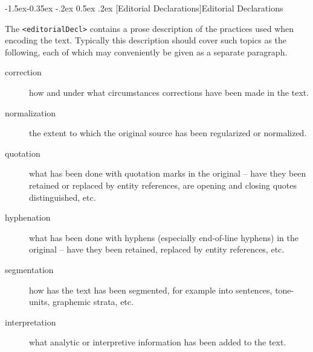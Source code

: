 \documentclass[11pt,twoside]{article}\makeatletter
\makeatletter
\renewcommand\subsubsection{\@startsection{subsubsection}{3}{\z@}%
     {-1.5ex\@plus -0.35ex \@minus -.2ex}%
     {0.5ex \@plus .2ex}%
     {\reset@font\large\sffamily}}
\makeatother
\begin{document}
\subsubsection[{Editorial Declarations}]{Editorial Declarations}\par
The \texttt{<editorialDecl>} contains a prose description of the practices used when encoding the text. Typically this description should cover such topics as the following, each of which may conveniently be given as a separate paragraph. \begin{description}

\item[{correction }]how and under what circumstances corrections have been made in the text.
\item[{normalization}]the extent to which the original source has been regularized or normalized.
\item[{quotation}]what has been done with quotation marks in the original -- have they been retained or replaced by entity references, are opening and closing quotes distinguished, etc. 
\item[{hyphenation}]what has been done with hyphens (especially end-of-line hyphens) in the original -- have they been retained, replaced by entity references, etc.
\item[{segmentation}]how has the text has been segmented, for example into sentences, tone-units, graphemic strata, etc.
\item[{interpretation}]what analytic or interpretive information has been added to the text. 
\end{description} \par
\end{document}
